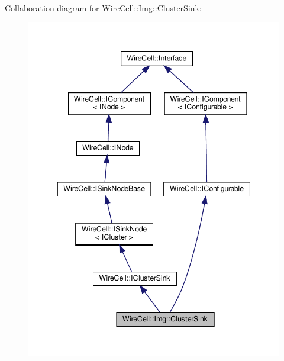 Collaboration diagram for Wire\+Cell\+:\+:Img\+:\+:Cluster\+Sink\+:
\nopagebreak
\begin{figure}[H]
\begin{center}
\leavevmode
\includegraphics[width=344pt]{class_wire_cell_1_1_img_1_1_cluster_sink__coll__graph}
\end{center}
\end{figure}
